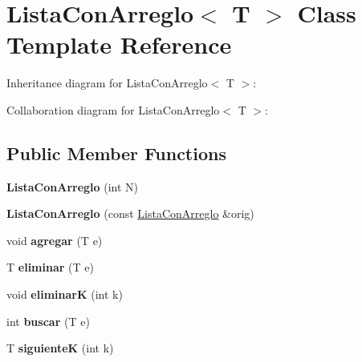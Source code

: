\hypertarget{class_lista_con_arreglo}{}\section{Lista\+Con\+Arreglo$<$ T $>$ Class Template Reference}
\label{class_lista_con_arreglo}


Inheritance diagram for Lista\+Con\+Arreglo$<$ T $>$\+:


Collaboration diagram for Lista\+Con\+Arreglo$<$ T $>$\+:
\subsection*{Public Member Functions}
\begin{DoxyCompactItemize}
\item 
{\bfseries Lista\+Con\+Arreglo} (int N)\hypertarget{class_lista_con_arreglo_a9541812a0019b76c6529184356913a59}{}\label{class_lista_con_arreglo_a9541812a0019b76c6529184356913a59}

\item 
{\bfseries Lista\+Con\+Arreglo} (const \hyperlink{class_lista_con_arreglo}{Lista\+Con\+Arreglo} \&orig)\hypertarget{class_lista_con_arreglo_ab7a22a8f04de9403d32a7431d4dd9627}{}\label{class_lista_con_arreglo_ab7a22a8f04de9403d32a7431d4dd9627}

\item 
void {\bfseries agregar} (T e)\hypertarget{class_lista_con_arreglo_a5336f6ef59e2cfaa008c4ad8cbee9f25}{}\label{class_lista_con_arreglo_a5336f6ef59e2cfaa008c4ad8cbee9f25}

\item 
T {\bfseries eliminar} (T e)\hypertarget{class_lista_con_arreglo_a87de1797dee84edee080f1676c475528}{}\label{class_lista_con_arreglo_a87de1797dee84edee080f1676c475528}

\item 
void {\bfseries eliminarK} (int k)\hypertarget{class_lista_con_arreglo_acd8b8f484dc440dc64dc58cad375e7e4}{}\label{class_lista_con_arreglo_acd8b8f484dc440dc64dc58cad375e7e4}

\item 
int {\bfseries buscar} (T e)\hypertarget{class_lista_con_arreglo_af2fe968f5ec674cb9640e11a1bcaab99}{}\label{class_lista_con_arreglo_af2fe968f5ec674cb9640e11a1bcaab99}

\item 
T {\bfseries siguienteK} (int k)\hypertarget{class_lista_con_arreglo_ad491d37617d43b24c91021db0102fc88}{}\label{class_lista_con_arreglo_ad491d37617d43b24c91021db0102fc88}


\end{DoxyCompactItemize}
